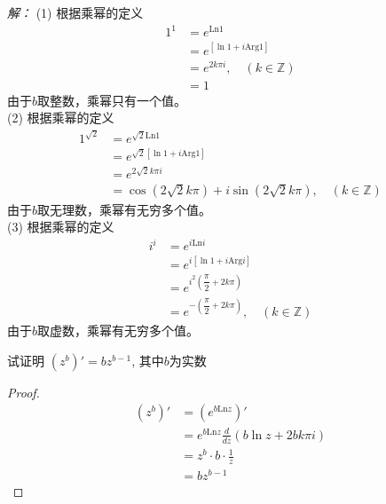 \emph{解：} (1) 根据乘幂的定义 
\[ \begin{aligned}
  1^{1} & =  e^{\text{Ln}1} \\
  &=  e^{[\ln 1 + i \text{Arg}1]}  \\
  &=  e^{2 k \pi i}  , \quad (k \in \mathbb{Z}) \\
  & = 1
\end{aligned} \]
由于$b$取整数，乘幂只有一个值。\\
(2) 根据乘幂的定义 
\[ \begin{aligned}
  1^{\sqrt{2}} & =  e^{\sqrt{2}\text{Ln}1} \\
  &=  e^{\sqrt{2}[\ln 1 + i \text{Arg}1]}  \\
  &=  e^{2\sqrt{2} k \pi i}  \\
  &= \cos (2\sqrt{2} k \pi )  + i \sin (2\sqrt{2} k \pi ), \quad (k \in \mathbb{Z})
\end{aligned} \]
由于$b$取无理数，乘幂有无穷多个值。\\
(3) 根据乘幂的定义 
\[ \begin{aligned}
  i^{i} & =  e^{i\text{Ln}i} \\
  &=  e^{i[\ln 1 + i \text{Arg}i]}  \\
  &=  e^{i^2 \left( \dfrac{\pi}{2} + 2 k \pi \right)}  \\
  &= e^{-\left( \dfrac{\pi}{2} + 2 k \pi \right)}, \quad (k \in \mathbb{Z})
\end{aligned} \]
由于$b$取虚数，乘幂有无穷多个值。\\

\begin{example}
  试证明 $ (z^b)' = b z^{b-1}$, 其中$b$为实数
\end{example}
\begin{proof}
  \[ \begin{aligned}
    (z^b)' & =  (e^{b \text{Ln} z})' \\
&= e^{b \text{Ln} z} \frac{d}{dz} (b \ln z + 2 b k \pi i) \\
&= z^b \cdot b \cdot \frac{1}{z} \\
&= b z^{b-1} 
  \end{aligned}\]
\end{proof}

